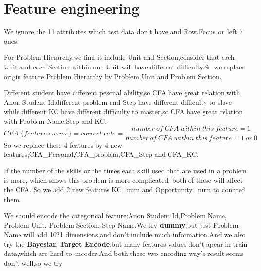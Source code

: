 \documentclass{article}
\begin{document}
	\section{Feature engineering}
	
	We ignore the 11 attributes which test data don't have and Row.Focus on left 7 ones.
	
	For Problem Hierarchy,we find it include Unit and Section,consider that each Unit and each Section within one Unit will have different difficulty.So we replace origin feature  Problem Hierarchy by Problem Unit and Problem Section.
	
	Different student have different pesonal ability,so CFA have great relation with Anon Student Id.different problem and Step have different difficulty to slove while different KC have different difficulty to master,so CFA have great relation with Problem Name,Step and KC.
	$$CFA\_\{features\ name\}=correct\ rate=\frac{number\  of\  CFA \ within\ this\ feature=1}{number\ of\ CFA\ within \ this\ feature= 1\ or\ 0}$$
	So we replace these 4 features by 4 new features,CFA\_Personal,CFA\_problem,CFA\_Step and CFA\_KC.
	
	If the number of the skills or the times each skill used that are used in a problem is more, which shows this problem is more complicated, both of these will affect the CFA.
	So we add 2 new features KC\_num and  Opportunity\_num to donated them.
	
	We should encode the categorical feature:Anon Student Id,Problem Name, Problem Unit, Problem Section, Step Name.We try \textbf{dummy},but just Problem Name will add 1021 dimensions,and don't include much information.And we also try the \textbf{Bayesian Target Encode},but many features values don't apear in train data,which are hard to encoder.And both these two encoding way's result seems don't well,so we try
\end{document}
